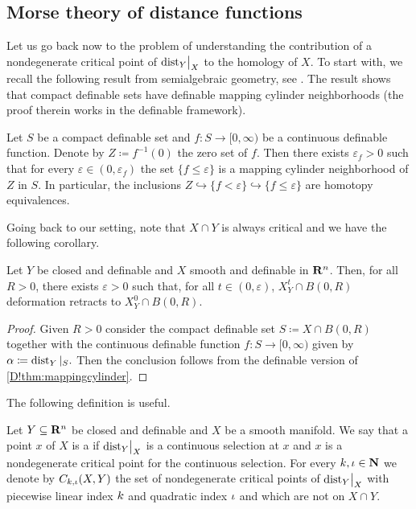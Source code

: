 \subsection{Morse theory of distance functions}

Let us go back now to the problem of understanding the contribution of a nondegenerate critical point of $\mathord{\operatorname{dist}}_Y\big|_X$ to the homology of $X$. To start with, we recall the following result from semialgebraic geometry, see \cite[Theorem 1.42]{lecturenotesantonio}. 
The result shows that compact definable sets have definable mapping cylinder neighborhoods (the proof therein works in the definable framework).

\begin{theorem}
\label{D!thm:mappingcylinder}
  Let $S$ be a compact definable set and $f \colon S \to [0, \infty)$ be a continuous definable function. Denote by $Z \coloneq f^{-1}(0)$ the zero set of $f$. Then there exists $\varepsilon_f > 0$ such that for every $\varepsilon \in (0, \varepsilon_f)$ the set $\{f \leq \varepsilon\}$ is a mapping cylinder neighborhood of $Z$ in $S$. In particular, the inclusions $Z\hookrightarrow \{f < \varepsilon\} \hookrightarrow \{f \leq \varepsilon\}$ are homotopy equivalences.
\end{theorem}

Going back to our setting, note that $X\cap Y$ is always critical and we have the following corollary.

\begin{corollary}
  Let $Y$ be closed and definable and $X$ smooth and definable in $\mathbf{R}^n$. Then, for all $R > 0$, there exists $\varepsilon > 0$ such that, for all $t \in (0, \varepsilon)$, $X_Y^t \cap B(0, R)$ deformation retracts to $X_Y^0 \cap B(0, R)$.
\end{corollary}

\begin{proof}
  Given $R>0$ consider the compact definable set $S \coloneq X \cap B(0, R)$  together with the continuous definable function $f \colon S \to [0, \infty)$ given by $\alpha \coloneq \operatorname{dist}_Y|_S.$ Then the conclusion follows from the definable version of \cref{D!thm:mappingcylinder}.
\end{proof}

The following definition is useful.

\begin{definition}
\label{D!def:setnondegcritpts}
  Let $Y\subseteq \mathbf{R}^n$ be closed and definable and $X$ be a smooth manifold. We say that a point $x$ of $X$ is a  if $\mathord{\operatorname{dist}}_Y\big|_X$ is a continuous selection at $x$ and $x$ is a nondegenerate critical point for the continuous selection. For every $k, \iota \in \mathbf{N}$ we denote by $C_{k, \iota}(X,Y)$ the set of nondegenerate critical points of $\mathord{\operatorname{dist}}_Y\big|_X$ with piecewise linear index $k$ and quadratic index $\iota$ and which are not on $X\cap Y$.
\end{definition}

